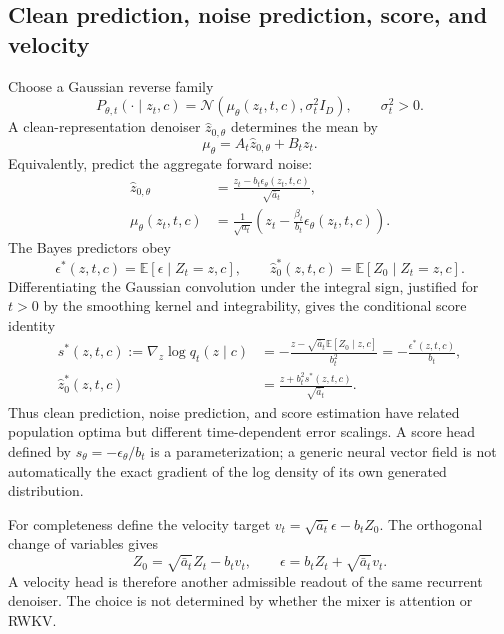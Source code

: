 \documentclass{article}
\theoremstyle{remark}\newtheorem{remark}[theorem]{Remark}
\newcommand{\E}{\mathbb E}
\begin{document}
\subsection{Clean prediction, noise prediction, score, and velocity}
Choose a Gaussian reverse family
\begin{equation}
 P_{\theta,t}(\cdot\mid z_t,c)=\mathcal N(\mu_\theta(z_t,t,c),\sigma_t^2I_D),\qquad\sigma_t^2>0.
\end{equation}
A clean-representation denoiser $\widehat z_{0,\theta}$ determines the mean by
\begin{equation}
 \mu_\theta=A_t\widehat z_{0,\theta}+B_tz_t.
 \label{eq:cleanmean}
\end{equation}
Equivalently, predict the aggregate forward noise:
\begin{align}
 \widehat z_{0,\theta}&=\frac{z_t-b_t\epsilon_\theta(z_t,t,c)}{\sqrt{\bar a_t}},\label{eq:noise2clean}\\
 \mu_\theta(z_t,t,c)&=\frac1{\sqrt{a_t}}
 \left(z_t-\frac{\beta_t}{b_t}\epsilon_\theta(z_t,t,c)\right).
 \label{eq:noisemean}
\end{align}
The Bayes predictors obey
\begin{equation}
 \epsilon^*(z,t,c)=\E[\epsilon\mid Z_t=z,c],\qquad
 \widehat z_0^*(z,t,c)=\E[Z_0\mid Z_t=z,c].
\end{equation}
Differentiating the Gaussian convolution under the integral sign, justified for $t>0$ by the smoothing kernel and integrability, gives the conditional score identity
\begin{align}
 s^*(z,t,c):=\nabla_z\log q_t(z\mid c)
 &=-\frac{z-\sqrt{\bar a_t}\E[Z_0\mid z,c]}{b_t^2}
 =-\frac{\epsilon^*(z,t,c)}{b_t},\label{eq:scoreidentity}\\
 \widehat z_0^*(z,t,c)&=\frac{z+b_t^2s^*(z,t,c)}{\sqrt{\bar a_t}}.
\end{align}
Thus clean prediction, noise prediction, and score estimation have related population optima but different time-dependent error scalings. A score head defined by $s_\theta=-\epsilon_\theta/b_t$ is a parameterization; a generic neural vector field is not automatically the exact gradient of the log density of its own generated distribution.

For completeness define the velocity target $v_t=\sqrt{\bar a_t}\epsilon-b_tZ_0$. The orthogonal change of variables gives
\begin{equation}
 Z_0=\sqrt{\bar a_t}Z_t-b_tv_t,\qquad
 \epsilon=b_tZ_t+\sqrt{\bar a_t}v_t.
 \label{eq:vprediction}
\end{equation}
A velocity head is therefore another admissible readout of the same recurrent denoiser. The choice is not determined by whether the mixer is attention or RWKV.
\end{document}
